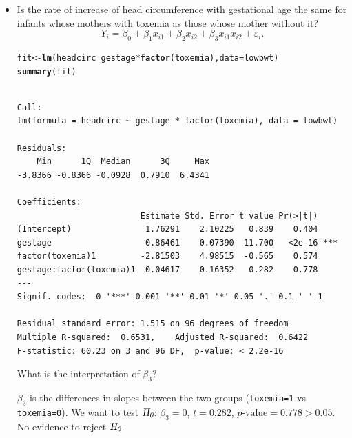 \documentclass{article}\usepackage[]{graphicx}\usepackage[svgnames]{xcolor}
\makeatletter
\newcommand{\hlopt}[1]{\textcolor[rgb]{0,0,0}{#1}}%
\newcommand{\hlstd}[1]{\textcolor[rgb]{0.345,0.345,0.345}{#1}}%
\newcommand{\hlkwb}[1]{\textcolor[rgb]{0.69,0.353,0.396}{#1}}%
\newcommand{\hlkwc}[1]{\textcolor[rgb]{0.333,0.667,0.333}{#1}}%
\newcommand{\hlkwd}[1]{\textcolor[rgb]{0.737,0.353,0.396}{\textbf{#1}}}%
\newenvironment{kframe}{%
 \def\at@end@of@kframe{}%
 \ifinner\ifhmode%
  \def\at@end@of@kframe{\end{minipage}}%
  \begin{minipage}{\columnwidth}%
 \fi\fi%
 \def\FrameCommand##1{\hskip\@totalleftmargin \hskip-\fboxsep
 \colorbox{shadecolor}{##1}\hskip-\fboxsep
     \hskip-\linewidth \hskip-\@totalleftmargin \hskip\columnwidth}%
 \MakeFramed {\advance\hsize-\width
   \@totalleftmargin\z@ \linewidth\hsize
   \@setminipage}}%
 {\par\unskip\endMakeFramed%
 \at@end@of@kframe}
\newenvironment{knitrout}{}{} %
\newcommand{\HN}{\textsl{H}_{\textsl{0}}}%
\makeatother
\begin{document}
\begin{itemize}
            $ \hat{\beta}_3=-1.41233 $. After adjustment of gestational age, the babies whose mothers had toxemia have smaller (by \qty{1.41}{\cm}) than
            those whose mothers did not. This difference is significant (test $ \HN $: $ \beta_2=0 $, $ p\text{-value}=0.0076<0.05$).
      \item Is the rate of increase of head circumference with gestational age the same
            for infants whose mothers with toxemia as those whose mother without it?
            \[ Y_i=\beta_0+\beta_1x_{i1}+\beta_2x_{i2}+\beta_3x_{i1}x_{i2}+\varepsilon_i. \]
\begin{knitrout}
\color{fgcolor}\begin{kframe}
\begin{alltt}
\hlstd{fit} \hlkwb{<-} \hlkwd{lm}\hlstd{(headcirc} \hlopt{~} \hlstd{gestage} \hlopt{*} \hlkwd{factor}\hlstd{(toxemia),} \hlkwc{data} \hlstd{= lowbwt)}
\hlkwd{summary}\hlstd{(fit)}
\end{alltt}
\begin{verbatim}

Call:
lm(formula = headcirc ~ gestage * factor(toxemia), data = lowbwt)

Residuals:
    Min      1Q  Median      3Q     Max 
-3.8366 -0.8366 -0.0928  0.7910  6.4341 

Coefficients:
                         Estimate Std. Error t value Pr(>|t|)    
(Intercept)               1.76291    2.10225   0.839    0.404    
gestage                   0.86461    0.07390  11.700   <2e-16 ***
factor(toxemia)1         -2.81503    4.98515  -0.565    0.574    
gestage:factor(toxemia)1  0.04617    0.16352   0.282    0.778    
---
Signif. codes:  0 '***' 0.001 '**' 0.01 '*' 0.05 '.' 0.1 ' ' 1

Residual standard error: 1.515 on 96 degrees of freedom
Multiple R-squared:  0.6531,	Adjusted R-squared:  0.6422 
F-statistic: 60.23 on 3 and 96 DF,  p-value: < 2.2e-16
\end{verbatim}
\end{kframe}
\end{knitrout}
            What is the interpretation of $ \beta_3 $?

            $ \beta_3 $ is the differences in slopes between the two groups (\texttt{toxemia=1} vs \texttt{toxemia=0}).
            We want to test $ \HN $: $ \beta_3=0 $, $ t=0.282 $, $ p\text{-value}=0.778>0.05 $. No evidence to reject $ \HN $.
\end{itemize}
\end{document}
